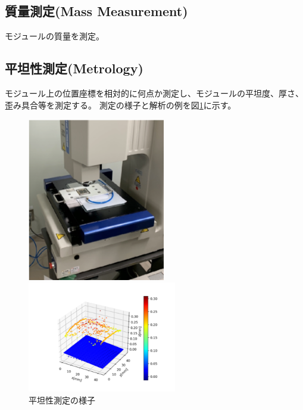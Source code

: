 \subsection{質量測定(Mass Measurement)}
モジュールの質量を測定。

\subsection{平坦性測定(Metrology)}
モジュール上の位置座標を相対的に何点か測定し、モジュールの平坦度、厚さ、歪み具合等を測定する。
測定の様子と解析の例を図\ref{Metrology_overview}に示す。

\begin{figure}[bpt]\centering
  \begin{minipage}{0.4\hsize}
    \begin{center}
    \includegraphics[width=60mm]{Metrology_setup}
    \end{center}
  \end{minipage}
  \begin{minipage}{0.4\hsize}
    \begin{center}
    \includegraphics[width=65mm]{Metrology_analysis}
    \end{center}
  \end{minipage}
  \caption[平坦性測定の様子]{平坦性測定の様子}
  \label{Metrology_overview}
\end{figure}

